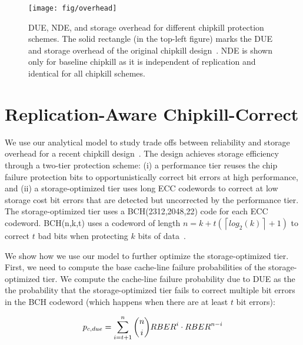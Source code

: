
\begin{figure}[tb]
\centering
\texttt{[image: fig/overhead]}
\caption{DUE, NDE, and storage overhead for different chipkill protection schemes.
The solid rectangle (in the top-left figure) marks the DUE and storage overhead of the original chipkill design~\cite{zhang:pm-chipkill:micro:2018}.
NDE is shown only for baseline chipkill as it is independent of replication and identical for all chipkill schemes.
}
\label{fig:overhead}
\vspace{-0.4cm}
\end{figure}

\section{Replication-Aware Chipkill-Correct}

We use our analytical model to study trade offs between reliability and storage overhead for a recent chipkill design~\cite{zhang:pm-chipkill:micro:2018}. 
The design achieves storage efficiency through a two-tier protection scheme: 
(i) a performance tier reuses the chip failure protection bits to opportunistically correct bit errors at high performance, and 
(ii) a storage-optimized tier uses long ECC codewords to correct at low storage cost bit errors that are detected but uncorrected by the performance tier.
The storage-optimized tier uses a BCH(2312,2048,22) code for each ECC codeword. BCH(n,k,t) uses a codeword of length $n=k+t(\left \lceil{log_2 (k)} \right \rceil+1)$ to correct $t$ bad bits when protecting $k$ bits of data~\cite{zhang:pm-chipkill:micro:2018}.

We show how we use our model to further optimize the storage-optimized tier. First, we need to compute the base cache-line failure probabilities of the storage-optimized tier.
We compute the cache-line failure probability due to DUE as the 
the probability that the storage-optimized tier fails to correct multiple bit errors in the BCH codeword (which happens when there are at least $t$ bit errors):

\begin{equation*}
{p_{c,due}}= \sum_{i=t+1}^{n}\binom{n}{i}{RBER}^i\cdot{RBER}^{n-i}
\end{equation*}


